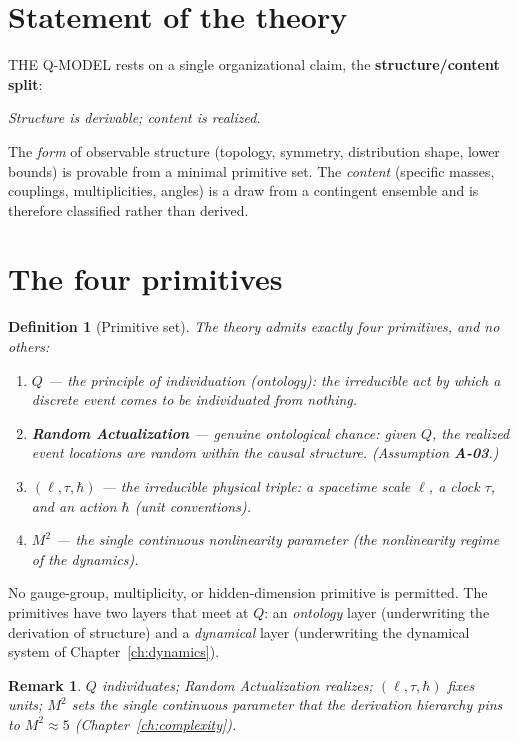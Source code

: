 \documentclass[10pt,twoside,openany]{book}
\newtheorem{definition}[theorem]{Definition}
\newtheorem{remark}[theorem]{Remark}
\begin{document}
\section{Statement of the theory}

THE Q-MODEL rests on a single organizational claim, the \textbf{structure/content split}:

\begin{center}
\emph{Structure is derivable; content is realized.}
\end{center}

The \emph{form} of observable structure (topology, symmetry, distribution shape, lower
bounds) is provable from a minimal primitive set. The \emph{content} (specific masses,
couplings, multiplicities, angles) is a draw from a contingent ensemble and is therefore
classified rather than derived.

\section{The four primitives}

\begin{definition}[Primitive set]
The theory admits exactly four primitives, and no others:
\begin{enumerate}
\item \textbf{$Q$} — the principle of individuation (ontology): the irreducible act by
which a discrete event comes to be individuated from nothing.
\item \textbf{Random Actualization} — genuine ontological chance: given $Q$, the realized
event locations are random within the causal structure. (Assumption \textbf{A-03}.)
\item \textbf{$(\ell,\tau,\hbar)$} — the irreducible physical triple: a spacetime scale
$\ell$, a clock $\tau$, and an action $\hbar$ (unit conventions).
\item \textbf{$M^2$} — the single continuous nonlinearity parameter (the nonlinearity
regime of the dynamics).
\end{enumerate}
\end{definition}

No gauge-group, multiplicity, or hidden-dimension primitive is permitted. The primitives
have two layers that meet at $Q$: an \emph{ontology} layer (underwriting the derivation of
structure) and a \emph{dynamical} layer (underwriting the dynamical system of
Chapter~\ref{ch:dynamics}).

\begin{remark}
$Q$ individuates; Random Actualization realizes; $(\ell,\tau,\hbar)$ fixes units; $M^2$
sets the single continuous parameter that the derivation hierarchy pins to $M^2\approx5$
(Chapter~\ref{ch:complexity}).
\end{remark}
\end{document}
